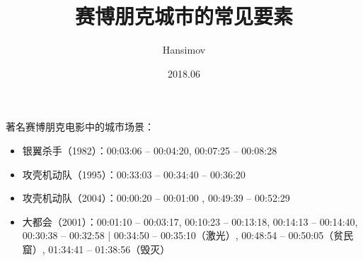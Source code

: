 \documentclass{beamer}
\title{赛博朋克城市的常见要素}
\author{Hansimov}
\institute{2001神经漫游指南}
\date{2018.06}
\begin{document}
\begin{frame}
\titlepage
\end{frame}





\begin{frame}

著名赛博朋克电影中的城市场景：

\begin{itemize}
    \item 银翼杀手（1982）：00:03:06 -- 00:04:20, 00:07:25 -- 00:08:28
    \item 攻壳机动队（1995）：00:33:03 -- 00:34:40 -- 00:36:20
    \item 攻壳机动队（2004）：00:00:20 -- 00:01:00  ,  00:49:39 -- 00:52:29
    \item 大都会（2001）：00:01:10 -- 00:03:17, 00:10:23 -- 00:13:18, 00:14:13 -- 00:14:40, 00:30:38 -- 00:32:58 | 00:34:50 -- 00:35:10（激光）, 00:48:54 -- 00:50:05（贫民窟）, 01:34:41 -- 01:38:56（毁灭）
\end{itemize}

\end{frame}
\end{document}
